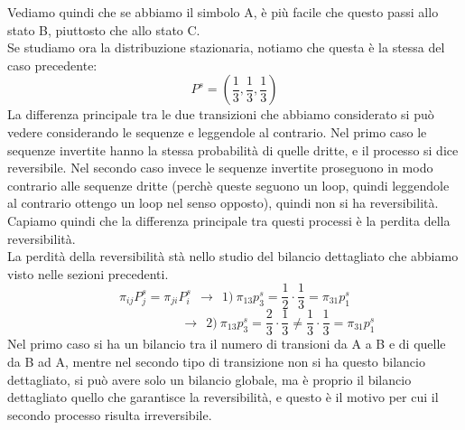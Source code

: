 \documentclass[12pt]{article}
\begin{document}
Vediamo quindi che se abbiamo il simbolo A, è più facile che questo passi allo stato B, piuttosto che allo stato C. \\
Se studiamo ora la distribuzione stazionaria, notiamo che questa è la stessa del caso precedente: 
$$
	P^s = \left(\frac{1}{3},\frac{1}{3},\frac{1}{3}\right)
$$ 
La differenza principale tra le due transizioni che abbiamo considerato si può vedere considerando le sequenze e leggendole al contrario. Nel primo caso le sequenze invertite hanno la stessa probabilità di quelle dritte, e il processo si dice reversibile. Nel secondo caso invece le sequenze invertite proseguono in modo contrario alle sequenze dritte (perchè queste seguono un loop, quindi leggendole al contrario ottengo un loop nel senso opposto), quindi non si ha reversibilità. Capiamo quindi che la differenza principale tra questi processi è la perdita della reversibilità. \\
La perdità della reversibilità stà nello studio del bilancio dettagliato che abbiamo visto nelle sezioni precedenti. 
$$
	\pi_{ij}P_j^s = \pi_{ji}P_i^s \ \ \longrightarrow \ \ 1) \ \pi_{13}p_3^s = \frac{1}{2}\cdot\frac{1}{3} = \pi_{31}p_1^s
$$
$$
	\ \ \ \ \ \ \ \ \ \ \ \ \ \ \ \ \ \ \ \ \ \ \ \ \ \ \ \ \ \ \  \longrightarrow \ \ 2) \ \pi_{13}p_3^s = \frac{2}{3}\cdot\frac{1}{3} \neq \frac{1}{3}\cdot\frac{1}{3} = \pi_{31}p_1^s
$$
Nel primo caso si ha un bilancio tra il numero di transioni da A a B e di quelle da B ad A, mentre nel secondo tipo di transizione non si ha questo bilancio dettagliato, si può avere solo un bilancio globale, ma è proprio il bilancio dettagliato quello che garantisce la reversibilità, e questo è il motivo per cui il secondo processo risulta irreversibile.
\end{document}
